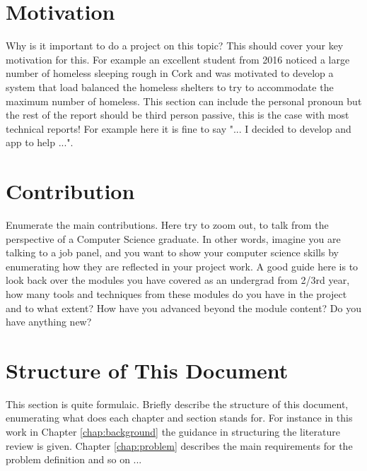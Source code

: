 \section{Motivation}
Why is it important to do a project on this topic? This should cover your key motivation for this. For example an excellent student from 2016 noticed a large number of homeless sleeping rough in Cork and was motivated to develop a system that load balanced the homeless shelters to try to accommodate the maximum number of homeless. This section can include the personal pronoun but the rest of the report should be third person passive, this is the case with most technical reports! For example here it is fine to say "... I decided to develop and app to help ...".

\section{Contribution}
Enumerate the main contributions. Here try to zoom out, to talk from the perspective of a Computer Science graduate. In other words, imagine you are talking to a job panel, and you want to show your computer science skills by enumerating how they are reflected in your project work. A good guide here is to look back over the modules you have covered as an undergrad from 2/3rd year, how many tools and techniques from these modules do you have in the project and to what extent? How have you advanced beyond the module content? Do you have anything new?

\section{Structure of This Document}
This section is quite formulaic. Briefly describe the structure of this document, enumerating what does each chapter and section stands for. For instance in this work in Chapter \ref{chap:background} the guidance in structuring the literature review is given. Chapter \ref{chap:problem} describes the main requirements for the problem definition and so on ...